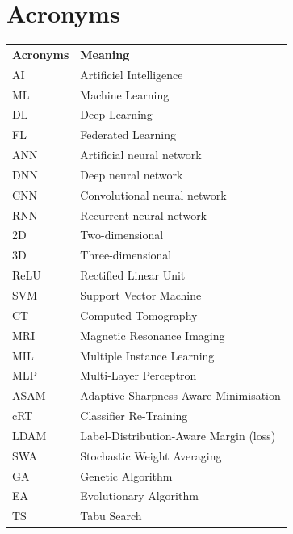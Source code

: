 \chapter*{Acronyms}

\begin{tabular}{l  l }
    

\textbf{Acronyms} & \textbf{Meaning} \\



AI &  Artificiel Intelligence \\

ML &  Machine Learning \\

DL & Deep Learning \\

FL & Federated Learning \\

ANN & Artificial neural network \\

DNN & Deep neural network \\

CNN & Convolutional neural network \\

RNN & Recurrent neural network \\

2D & Two-dimensional \\

3D & Three-dimensional \\

ReLU & Rectified Linear Unit \\

SVM & Support Vector Machine \\

CT & Computed Tomography \\

MRI & Magnetic Resonance Imaging \\

MIL & Multiple Instance Learning \\

MLP & Multi-Layer Perceptron \\

ASAM & Adaptive Sharpness-Aware Minimisation \\

cRT & Classifier Re-Training \\

LDAM & Label-Distribution-Aware Margin (loss) \\

SWA & Stochastic Weight Averaging \\

GA & Genetic Algorithm\\

EA & Evolutionary Algorithm \\

TS & Tabu Search \\ 

\end{tabular}
